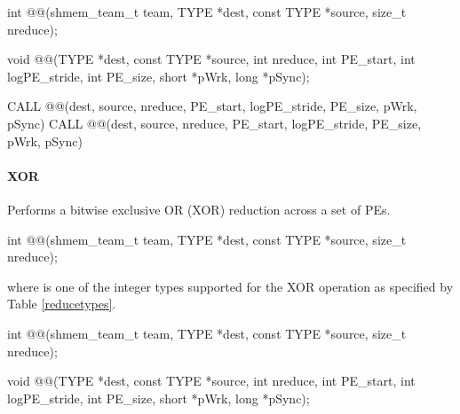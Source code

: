 \begin{apidefinition}
\begin{Csynopsis}
\end{Csynopsis}
{\color{Green}
\begin{CsynopsisCol}
int @@(shmem_team_t team, TYPE *dest, const TYPE *source, size_t nreduce);
\end{CsynopsisCol}
}
\begin{DeprecateBlock}
\begin{CsynopsisCol}
void @@(TYPE *dest, const TYPE *source, int nreduce, int PE_start, int logPE_stride, int PE_size, short *pWrk, long *pSync);
\end{CsynopsisCol}
\end{DeprecateBlock}

\begin{Fsynopsis}
CALL @@(dest, source, nreduce, PE_start, logPE_stride, PE_size, pWrk, pSync)
CALL @@(dest, source, nreduce, PE_start, logPE_stride, PE_size, pWrk, pSync)
\end{Fsynopsis}

\paragraph{XOR}
Performs a bitwise exclusive OR (XOR) reduction across a set of \acp{PE}.\newline

{\color{Green}
\begin{C11synopsis}
int @@(shmem_team_t team, TYPE *dest, const TYPE *source, size_t nreduce);
\end{C11synopsis}
where \TYPE{} is one of the integer types supported for the XOR operation as specified by Table \ref{reducetypes}.
}

\begin{Csynopsis}
\end{Csynopsis}
{\color{Green}
\begin{CsynopsisCol}
int @@(shmem_team_t team, TYPE *dest, const TYPE *source, size_t nreduce);
\end{CsynopsisCol}
}
\begin{DeprecateBlock}
\begin{CsynopsisCol}
void @@(TYPE *dest, const TYPE *source, int nreduce, int PE_start, int logPE_stride, int PE_size, short *pWrk, long *pSync);
\end{CsynopsisCol}
\end{DeprecateBlock}


\end{apidefinition}
